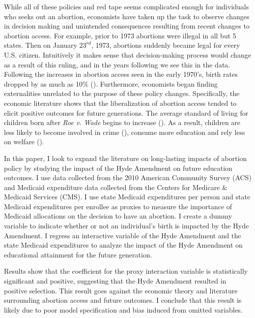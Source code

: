     While all of these policies and red tape seems complicated enough for individuals who seeks out an abortion, economists have taken up the task to observe changes in decision making and unintended consequences resulting from recent changes to abortion access. For example, prior to 1973 abortions were illegal in all but 5 states. Then on January $23^{rd}$, 1973, abortions suddenly became legal for every U.S. citizen. Intuitively it makes sense that decision-making process would change as a result of this ruling, and in the years following we see this in the data. Following the increases in abortion access seen in the early 1970’s, birth rates dropped by as much as 10\% (\cite{levine_2}).
    Furthermore, economists began finding externalities unrelated to the purpose of these policy changes. Specifically, the economic literature shows that the liberalization of abortion access tended to elicit positive outcomes for future generations. The average standard of living for children born after \textit{Roe v. Wade} begins to increase (\cite{gruber}). As a result, children are less likely to become involved in crime (\cite{levitt}), consume more education and rely less on welfare (\cite{ananat}).

    In this paper, I look to expand the literature on long-lasting impacts of abortion policy by studying the impact of the Hyde Amendment on future education outcomes. I use data collected from the 2010 American Community Survey (ACS) and Medicaid expenditure data collected from the Centers for Medicare \& Medicaid Services (CMS). I use state Medicaid expenditures per person and state Medicaid expenditures per enrollee as proxies to measure the importance of Medicaid allocations on the decision to have an abortion. I create a dummy variable to indicate whether or not an individual's birth is impacted by the Hyde Amendment. I regress an interactive variable of the Hyde Amendment and the state Medicaid expenditures to analyze the impact of the Hyde Amendment on educational attainment for the future generation.

    Results show that the coefficient for the proxy interaction variable is statistically significant and positive, suggesting that the Hyde Amendment resulted in positive selection. This result goes against the economic theory and literature surrounding abortion access and future outcomes. I conclude that this result is likely due to poor model specification and bias induced from omitted variables.

